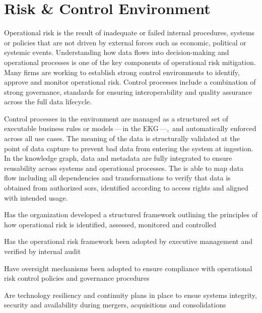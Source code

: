 \section{Risk \& Control Environment}\label{sec:ekgmm-b-4-6} %

Operational risk is the result of inadequate or failed internal procedures,
systems or policies that are not driven by external forces such as economic, political or systemic events.
Understanding how data flows into decision-making and operational processes is one of the key components of
operational risk mitigation.
Many firms are working to establish strong control environments to identify, approve and monitor operational risk.
Control processes include a combination of strong governance, standards for ensuring interoperability and
quality assurance across the full data lifecycle.

\ekgmmContextSection

Control processes in the  environment are managed as a structured set of executable business rules
or models\,---\,in the EKG\,---,\ and automatically enforced across all use cases.
The meaning of the data is structurally validated at the point of data capture to prevent bad data from
entering the system at ingestion.
In the knowledge graph, data and metadata are fully integrated to ensure reusability across systems
and operational processes.
The  is able to map data flow including all dependencies and transformations to verify that
data is obtained from authorized \glspl{sor}, identified according to access rights and
aligned with intended usage.

\kgmmcorequestionssection

\begin{core-questions}

  \item [\thesection.1] Has the organization developed a structured framework outlining the principles of how
                        operational risk is identified, assessed, monitored and controlled
  \item [\thesection.2] Has the operational risk framework been adopted by executive management and verified by
                        internal audit
  \item [\thesection.3] Have oversight mechanisms been adopted to ensure compliance with operational risk
                        control policies and governance procedures
  \item [\thesection.4] Are technology resiliency and continuity plans in place to ensue systems integrity,
                        security and availability during mergers, acquisitions and consolidations

\end{core-questions}

